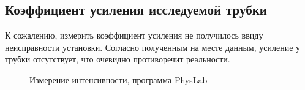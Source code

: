 \documentclass[a4paper,12pt]{article}
\theoremstyle{definition}
\begin{document}
\subsection{Коэффициент усиления исследуемой трубки}
\par К сожалению, измерить коэффициент усиления не получилось ввиду неисправности установки. 
Согласно полученным на месте данным, усиление у трубки отсутствует, что очевидно противоречит
реальности.

\begin{figure}[H]
	\begin{minipage}[h]{0.49\linewidth}
		\caption{Измерение интенсивности, программа PhysLab}
	\end{minipage}
	\begin{minipage}[h]{0.49\linewidth}

\end{minipage}
\end{figure}
\end{document}
